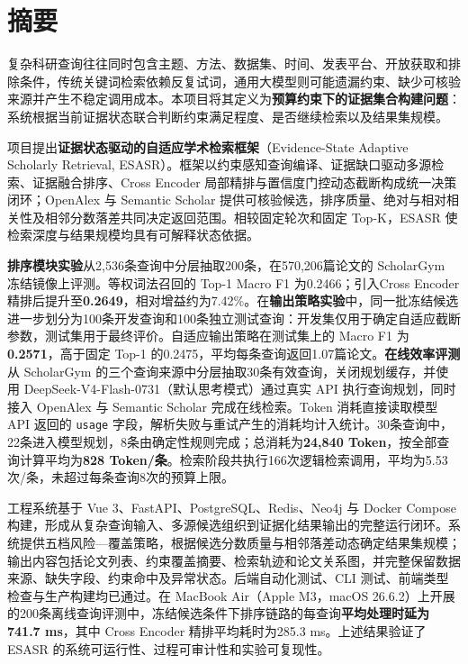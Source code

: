 \documentclass[a4paper,12pt,fontset=none]{ctexart}
\begin{document}
\section*{摘要}

复杂科研查询往往同时包含主题、方法、数据集、时间、发表平台、开放获取和排除条件，传统关键词检索依赖反复试词，通用大模型则可能遗漏约束、缺少可核验来源并产生不稳定调用成本。本项目将其定义为\textbf{预算约束下的证据集合构建问题}：系统根据当前证据状态联合判断约束满足程度、是否继续检索以及结果集规模。

项目提出\textbf{证据状态驱动的自适应学术检索框架}（Evidence-State Adaptive Scholarly Retrieval, ESASR）。框架以约束感知查询编译、证据缺口驱动多源检索、证据融合排序、Cross Encoder 局部精排与置信度门控动态截断构成统一决策闭环；OpenAlex 与 Semantic Scholar 提供可核验候选，排序质量、绝对与相对相关性及相邻分数落差共同决定返回范围。相较固定轮次和固定 Top-K，ESASR 使检索深度与结果规模均具有可解释状态依据。

\textbf{排序模块实验}从2,536条查询中分层抽取200条，在570,206篇论文的 ScholarGym 冻结镜像上评测。等权词法召回的 Top-1 Macro F1 为0.2466；引入Cross Encoder 精排后提升至\textbf{0.2649}，相对增益约为7.42\%。在\textbf{输出策略实验}中，同一批冻结候选进一步划分为100条开发查询和100条独立测试查询：开发集仅用于确定自适应截断参数，测试集用于最终评价。自适应输出策略在测试集上的 Macro F1 为\textbf{0.2571}，高于固定 Top-1 的0.2475，平均每条查询返回1.07篇论文。\textbf{在线效率评测}从 ScholarGym 的三个查询来源中分层抽取30条有效查询，关闭规划缓存，并使用 DeepSeek-V4-Flash-0731（默认思考模式）通过真实 API 执行查询规划，同时接入 OpenAlex 与 Semantic Scholar 完成在线检索。Token 消耗直接读取模型 API 返回的 \texttt{usage} 字段，解析失败与重试产生的消耗均计入统计。30条查询中，22条进入模型规划，8条由确定性规则完成；总消耗为\textbf{24,840 Token}，按全部查询计算平均为\textbf{828 Token/条}。检索阶段共执行166次逻辑检索调用，平均为5.53次/条，未超过每条查询8次的预算上限。

工程系统基于 Vue 3、FastAPI、PostgreSQL、Redis、Neo4j 与 Docker Compose 构建，形成从复杂查询输入、多源候选组织到证据化结果输出的完整运行闭环。系统提供五档风险—覆盖策略，根据候选分数质量与相邻落差动态确定结果集规模；输出内容包括论文列表、约束覆盖摘要、检索轨迹和论文关系图，并完整保留数据来源、缺失字段、约束命中及异常状态。后端自动化测试、CLI 测试、前端类型检查与生产构建均已通过。在 MacBook Air（Apple M3，macOS 26.6.2）上开展的200条离线查询评测中，冻结候选条件下排序链路的每查询\textbf{平均处理时延为741.7 ms}，其中 Cross Encoder 精排平均耗时为285.3 ms。上述结果验证了 ESASR 的系统可运行性、过程可审计性和实验可复现性。
\end{document}
